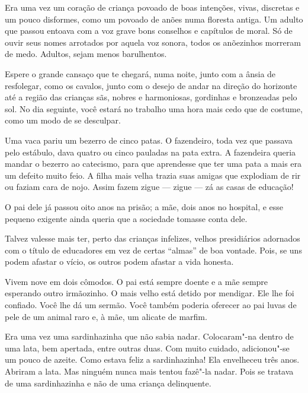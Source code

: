 \pagebreak

Era uma vez um coração de criança povoado de boas intenções, vivas,
discretas e um pouco disformes, como um povoado de anões numa floresta
antiga. Um adulto que passou entoava com a voz grave bons conselhos e
capítulos de moral. Só de ouvir seus nomes arrotados por aquela voz
sonora, todos os anõezinhos morreram de medo. Adultos, sejam menos
barulhentos.

\bigskip
\bigskip


Espere o grande cansaço que te chegará, numa noite, junto com a ânsia de
resfolegar, como os cavalos, junto com o desejo de andar na direção do
horizonte até a região das crianças sãs, nobres e harmoniosas, gordinhas
e bronzeadas pelo sol. No dia seguinte, você estará no trabalho uma hora
mais cedo que de costume, como um modo de se desculpar.

\bigskip
\bigskip

Uma vaca pariu um bezerro de cinco patas. O fazendeiro, toda vez que
passava pelo estábulo, dava quatro ou cinco pauladas na pata extra. A
fazendeira queria mandar o bezerro ao catecismo, para que aprendesse que
ter uma pata a mais era um defeito muito feio. A filha mais velha trazia
suas amigas que explodiam de rir ou faziam cara de nojo. Assim fazem
zigue --- zigue --- zá as casas de educação!

\bigskip
\bigskip

O pai dele já passou oito anos na prisão; a mãe, dois anos no hospital,
e esse pequeno exigente ainda queria que a sociedade tomasse conta dele.

\bigskip
\bigskip

Talvez valesse mais ter, perto das crianças infelizes, velhos
presidiários adornados com o título de educadores em vez de certas
``almas'' de boa vontade. Pois, se uns podem afastar o vício, os outros
podem afastar a vida honesta.

\bigskip
\bigskip

Vivem nove em dois cômodos. O pai está sempre doente e a mãe sempre
esperando outro irmãozinho. O mais velho está detido por mendigar. Ele
lhe foi confiado. Você lhe dá um sermão. Você também poderia oferecer ao
pai luvas de pele de um animal raro e, à mãe, um alicate de marfim.

\bigskip
\bigskip

Era uma vez uma sardinhazinha que não sabia nadar. Colocaram"-na dentro
de uma lata, bem apertada, entre outras duas. Com muito cuidado,
adicionou"-se um pouco de azeite. Como estava feliz a sardinhazinha! Ela
envelheceu três anos. Abriram a lata. Mas ninguém nunca mais tentou
fazê"-la nadar. Pois se tratava de uma sardinhazinha e não de uma criança
delinquente.


